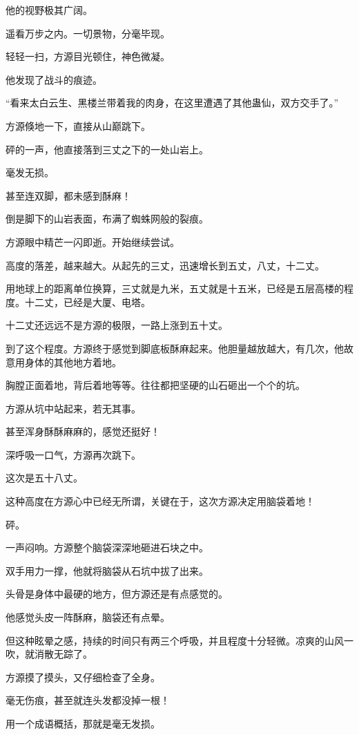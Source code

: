\begin{this_body}
他的视野极其广阔。

遥看万步之内。一切景物，分毫毕现。

轻轻一扫，方源目光顿住，神色微凝。

他发现了战斗的痕迹。

“看来太白云生、黑楼兰带着我的肉身，在这里遭遇了其他蛊仙，双方交手了。”

方源倏地一下，直接从山巅跳下。

砰的一声，他直接落到三丈之下的一处山岩上。

毫发无损。

甚至连双脚，都未感到酥麻！

倒是脚下的山岩表面，布满了蜘蛛网般的裂痕。

方源眼中精芒一闪即逝。开始继续尝试。

高度的落差，越来越大。从起先的三丈，迅速增长到五丈，八丈，十二丈。

用地球上的距离单位换算，三丈就是九米，五丈就是十五米，已经是五层高楼的程度。十二丈，已经是大厦、电塔。

十二丈还远远不是方源的极限，一路上涨到五十丈。

到了这个程度。方源终于感觉到脚底板酥麻起来。他胆量越放越大，有几次，他故意用身体的其他地方着地。

胸膛正面着地，背后着地等等。往往都把坚硬的山石砸出一个个的坑。

方源从坑中站起来，若无其事。

甚至浑身酥酥麻麻的，感觉还挺好！

深呼吸一口气，方源再次跳下。

这次是五十八丈。

这种高度在方源心中已经无所谓，关键在于，这次方源决定用脑袋着地！

砰。

一声闷响。方源整个脑袋深深地砸进石块之中。

双手用力一撑，他就将脑袋从石坑中拔了出来。

头骨是身体中最硬的地方，但方源还是有点感觉的。

他感觉头皮一阵酥麻，脑袋还有点晕。

但这种眩晕之感，持续的时间只有两三个呼吸，并且程度十分轻微。凉爽的山风一吹，就消散无踪了。

方源摸了摸头，又仔细检查了全身。

毫无伤痕，甚至就连头发都没掉一根！

用一个成语概括，那就是毫无发损。


\end{this_body}
